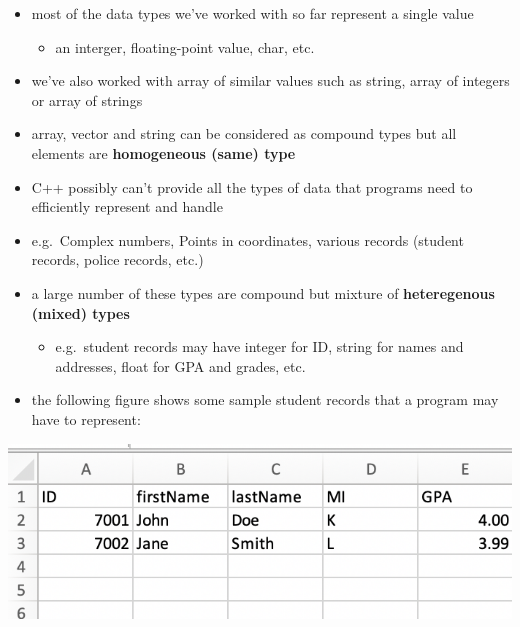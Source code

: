\documentclass[11pt]{article}
\providecommand{\tightlist}{%
      \setlength{\itemsep}{0pt}\setlength{\parskip}{0pt}}
\begin{document}
\begin{itemize}
\tightlist
\item
  most of the data types we've worked with so far represent a single
  value

  \begin{itemize}
  \tightlist
  \item
    an interger, floating-point value, char, etc.
  \end{itemize}
\item
  we've also worked with array of similar values such as string, array
  of integers or array of strings
\item
  array, vector and string can be considered as compound types but all
  elements are \textbf{homogeneous (same) type}
\item
  C++ possibly can't provide all the types of data that programs need to
  efficiently represent and handle
\item
  e.g.~Complex numbers, Points in coordinates, various records (student
  records, police records, etc.)
\item
  a large number of these types are compound but mixture of
  \textbf{heteregenous (mixed) types}

  \begin{itemize}
  \tightlist
  \item
    e.g.~student records may have integer for ID, string for names and
    addresses, float for GPA and grades, etc.
  \end{itemize}
\item
  the following figure shows some sample student records that a program
  may have to represent:
\end{itemize}

\includegraphics{resources/records.png}
\end{document}

